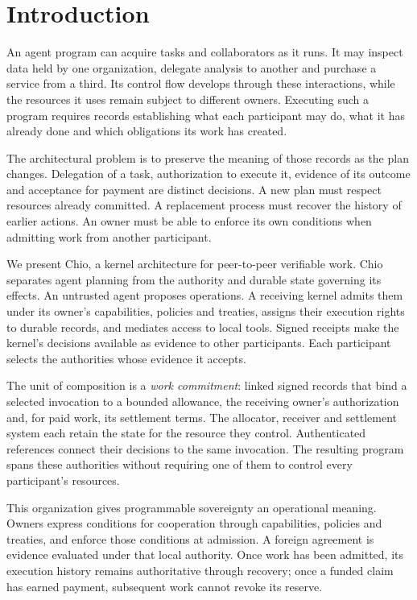 \section{Introduction}
\label{sec:introduction}
An agent program can acquire tasks and collaborators as it runs. It may inspect
data held by one organization, delegate analysis to another and purchase a
service from a third. Its control flow develops through these interactions,
while the resources it uses remain subject to different owners. Executing such
a program requires records establishing what each participant may do, what it
has already done and which obligations its work has created.

The architectural problem is to preserve the meaning of those records as the
plan changes. Delegation of a task, authorization to execute it, evidence of its
outcome and acceptance for payment are distinct decisions. A new plan must
respect resources already committed. A replacement process must recover the
history of earlier actions. An owner must be able to enforce its own conditions
when admitting work from another participant.

We present Chio, a kernel architecture for peer-to-peer verifiable work. Chio
separates agent planning from the authority and durable state governing its
effects. An untrusted agent proposes operations. A receiving kernel admits
them under its owner's capabilities, policies and treaties, assigns their
execution rights to durable records, and mediates access to local tools.
Signed receipts make the kernel's decisions available as evidence to other
participants. Each participant selects the authorities whose evidence it accepts.

The unit of composition is a \emph{work commitment}: linked signed records that
bind a selected invocation to a bounded allowance, the receiving owner's
authorization and, for paid work, its settlement terms. The allocator, receiver
and settlement system each retain the state for the resource they control.
Authenticated references connect their decisions to the same invocation.
The resulting program spans these authorities without requiring one of them
to control every participant's resources.

This organization gives programmable sovereignty an operational meaning.
Owners express conditions for cooperation through capabilities, policies and
treaties, and enforce those conditions at admission. A foreign agreement is
evidence evaluated under that local authority. Once work has been admitted,
its execution history remains authoritative through recovery; once a funded
claim has earned payment, subsequent work cannot revoke its reserve.


